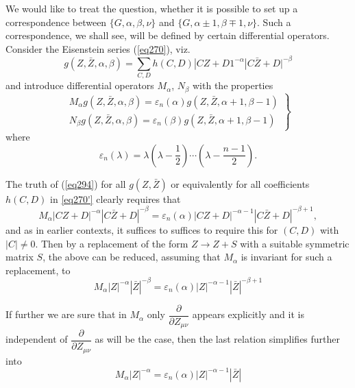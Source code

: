 We would like to treat the question, whether it is possible to set up
a correspondence between $\{ G, \alpha, \beta, \nu \}$ and $\{ G,
\alpha \pm 1, \beta \mp 1, \nu \}$. Such a correspondence, we shall
\pageoriginale see, will be defined by certain differential
operators. Consider the Eisenstein series (\ref{eq270}), viz.  
\begin{equation*}
g (Z, \bar{Z}, \alpha, \beta) = \sum_{C, D} h (C, D) | CZ + D1 ^{-
  \alpha} | C \bar{Z} + D|^{-\beta}\tag*{$(270)'$}\label{eq270'} 
\end{equation*}
and introduce differential operators $M_{\alpha}$, $N_{\beta}$ with the
properties  
\begin{equation*}
\left.
\begin{aligned}
M_\alpha g(Z, \bar{Z}, \alpha, \beta)  = \varepsilon_n (\alpha) g (Z,
\bar{Z}, \alpha +1, \beta - 1)\\ 
N_\beta g(Z, \bar{Z}, \alpha, \beta)  = \varepsilon_n (\beta) g (Z,
\bar{Z}, \alpha +1, \beta - 1) 
\end{aligned}
\right \} \tag{294}\label{eq294}    
\end{equation*}
where
\begin{equation*}
\varepsilon_n (\lambda)  = \lambda (\lambda - \frac{1}{2}) \cdots
(\lambda - \frac{n -1}{2}). \tag{295}\label{eq295}     
\end{equation*}

The truth of (\ref{eq294}) for all $g (Z, \bar{Z})$ or equivalently for all
coefficients $h (C, D)$  in \ref{eq270'} clearly requires that  
$$
M_\alpha | CZ + D|^{-\alpha} |C \bar{Z} + D|^{- \beta} = \varepsilon_n
(\alpha) |C Z + D|^{- \alpha - 1} |C \bar{Z} + D|^{- \beta + 1}, 
$$
and as in earlier contexts, it suffices to suffices to require this
for $(C, D)$ with $|C| \neq 0$. Then by a replacement of the form $Z
\to Z + S$ with a suitable symmetric matrix $S$, the above can be
reduced, assuming that $M_\alpha$ is invariant for such a replacement,
to  
$$
M_\alpha |Z|^{-\alpha} |\bar{Z}|^{ - \beta} = \varepsilon_n (\alpha)
|Z|^{-\alpha - 1} |\bar{Z}|^{- \beta + 1} 
$$

If further we are sure that in $M_\alpha$ only
$\dfrac{\partial}{\partial Z_{\mu \nu}}$ appears explicitly and it is
independent of $\dfrac{\partial}{\partial Z_{\mu \nu}}$ as will be the
case, then the last relation simplifies further into 
\begin{equation*}
M_\alpha |Z|^{- \alpha} = \varepsilon_n (\alpha) |Z|
^{- \alpha - 1 } |\bar{Z}| \tag{296}\label{eq296}    
\end{equation*}

